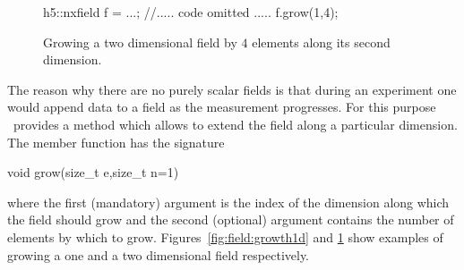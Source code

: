 \begin{figure}[tb]
    \begin{minipage}[c]{0.3\linewidth}
        \begin{cppcode}
h5::nxfield f = ...;
//..... code omitted .....
f.grow(1,4);
        \end{cppcode}
    \end{minipage}
    \hfill
    \begin{minipage}[c]{0.65\linewidth}
    \end{minipage}
    \caption{{\small\label{fig:field:growth2d} Growing a two dimensional field
    by $4$ elements along its second dimension.}}
\end{figure}
The reason why there are no purely scalar fields is that during an experiment 
one would append data to a field as the measurement progresses. 
For this purpose \nxfield\ provides a  method which allows to 
extend the field along a particular dimension. The member function has the 
signature
\begin{cppcode}
void grow(size_t e,size_t n=1)
\end{cppcode}
where the first (mandatory) argument is the index of the dimension along which
the field should grow and the second (optional) argument contains the number of 
elements by which to grow. Figures~\ref{fig:field:growth1d} and
\ref{fig:field:growth2d} show examples of growing a one and a two dimensional
field respectively.

